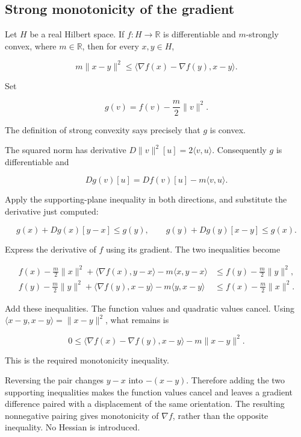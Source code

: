 \documentclass[11pt,a4paper]{report}
\begin{document}
\subsection{\texorpdfstring{Strong monotonicity of the gradient}{Strong monotonicity of the gradient}}
\label{report-step-UnadjustedLangevin-StrongConvexity-lean-2}


Let \(H\) be a real Hilbert space. If \(f:H\to\mathbb R\) is differentiable and \(m\)-strongly convex, where \(m\in\mathbb R\), then for every \(x,y\in H\),

\[m\|x-y\|^2\le\langle\nabla f(x)-\nabla f(y),x-y\rangle.\]

Set

\[g(v)=f(v)-\frac m2\|v\|^2.\]

The definition of strong convexity says precisely that \(g\) is convex.



The squared norm has derivative \(D\|v\|^2[u]=2\langle v,u\rangle\). Consequently \(g\) is differentiable and

\[Dg(v)[u]=Df(v)[u]-m\langle v,u\rangle.\]

Apply the supporting-plane inequality in both directions, and substitute the derivative just computed:

\[g(x)+Dg(x)[y-x]\le g(y),\qquad g(y)+Dg(y)[x-y]\le g(x).\]

Express the derivative of \(f\) using its gradient. The two inequalities become

\[\begin{aligned}f(x)-\tfrac m2\|x\|^2+\langle\nabla f(x),y-x\rangle-m\langle x,y-x\rangle&\le f(y)-\tfrac m2\|y\|^2,\\ f(y)-\tfrac m2\|y\|^2+\langle\nabla f(y),x-y\rangle-m\langle y,x-y\rangle&\le f(x)-\tfrac m2\|x\|^2.\end{aligned}\]

Add these inequalities. The function values and quadratic values cancel. Using \(\langle x-y,x-y\rangle=\|x-y\|^2\), what remains is

\[0\le\langle\nabla f(x)-\nabla f(y),x-y\rangle-m\|x-y\|^2.\]

This is the required monotonicity inequality.



Reversing the pair changes \(y-x\) into \(-(x-y)\). Therefore adding the two supporting inequalities makes the function values cancel and leaves a gradient difference paired with a displacement of the same orientation. The resulting nonnegative pairing gives monotonicity of \(\nabla f\), rather than the opposite inequality. No Hessian is introduced.
\end{document}
